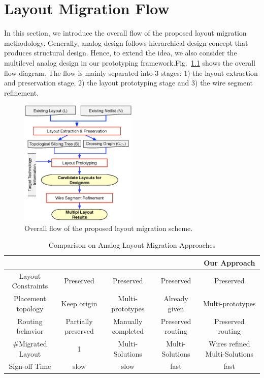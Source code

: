 \chapter{Layout Migration Flow}\label{sec:migration}

  In this section, we introduce the overall flow of the proposed layout migration methodology.
  Generally, analog design follows hierarchical design concept that produces structural design. 
  Hence, to extend the idea, we also consider the multilevel analog design in our prototyping framework.Fig.~\ref{fig:Flow} shows the overall flow diagram.
  The flow is mainly separated into 3 stages: 1) the layout extraction and preservation stage, 2) the layout prototyping stage and 3) the wire segment refinement. 
  
  
  \begin{figure}[ht]
  \centering
  \includegraphics[width=0.5\textwidth]{Fig/Flow.eps}
  \caption{Overall flow of the proposed layout migration scheme.} 
  \label{fig:Flow}
  \end{figure}

  \begin{table}
    \begin{center}
    \caption{Comparison on Analog Layout Migration Approaches}\label{table:MigrateComp}
    \scriptsize
    \begin{tabular}{|c|c|c|c|c|}
      \hline
      & \cite{msc-bhattacharya-tcad06} & \cite{ALP_YPWeng_iccad2011} & \cite{Chin_DMR_ICCAD2013} & Our Approach \\
      \hline
      Layout Constraints & Preserved & Preserved & Preserved & Preserved \\
      \hline
      Placement topology  & Keep origin & Multi-prototypes & Already given & Multi-prototypes \\
      \hline  
      Routing behavior  & Partially preserved &  Manually completed &  Preserved routing & Preserved routing \\
      \hline
      \#Migrated Layout &  1 &  Multi-Solutions & Multi-Solutions & Wires refined Multi-Solutions \\
      \hline
      Sign-off Time &   slow &  slow &  fast &  fast \\
      \hline
    \end{tabular}
    \end{center}
  \end{table}

